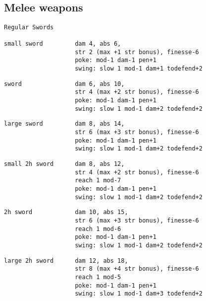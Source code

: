 \

\subsection*{Melee weapons}
\raggedbottom
\goodbreak \small \begin{samepage} \begin{verbatim}
Regular Swords

small sword         dam 4, abs 6,
                    str 2 (max +1 str bonus), finesse-6
                    poke: mod-1 dam-1 pen+1
                    swing: slow 1 mod-1 dam+1 todefend+2
\end{verbatim} \blocklistgap \begin{verbatim}
sword               dam 6, abs 10,
                    str 4 (max +2 str bonus), finesse-6
                    poke: mod-1 dam-1 pen+1
                    swing: slow 1 mod-1 dam+2 todefend+2
\end{verbatim} \blocklistgap \begin{verbatim}
large sword         dam 8, abs 14,
                    str 6 (max +3 str bonus), finesse-6
                    poke: mod-1 dam-1 pen+1
                    swing: slow 1 mod-1 dam+2 todefend+2
\end{verbatim} \blocklistgap \begin{verbatim}
small 2h sword      dam 8, abs 12,
                    str 4 (max +2 str bonus), finesse-6
                    reach 1 mod-7
                    poke: mod-1 dam-1 pen+1
                    swing: slow 1 mod-1 dam+2 todefend+2
\end{verbatim} \blocklistgap \begin{verbatim}
2h sword            dam 10, abs 15,
                    str 6 (max +3 str bonus), finesse-6
                    reach 1 mod-6
                    poke: mod-1 dam-1 pen+1
                    swing: slow 1 mod-1 dam+2 todefend+2
\end{verbatim} \blocklistgap \begin{verbatim}
large 2h sword      dam 12, abs 18,
                    str 8 (max +4 str bonus), finesse-6
                    reach 1 mod-5
                    poke: mod-1 dam-1 pen+1
                    swing: slow 1 mod-1 dam+3 todefend+2
\end{verbatim} \end{samepage} \normalsize \goodbreak

\

